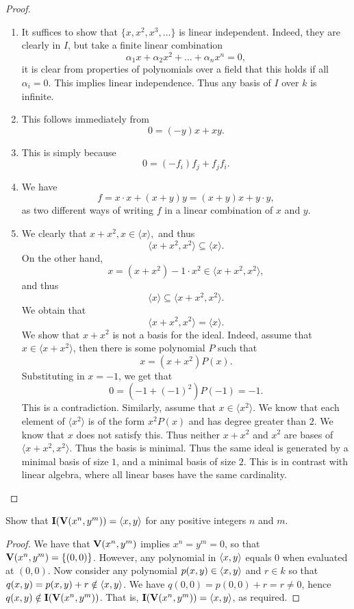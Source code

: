 \begin{proof}
    \begin{enumerate}
        \item It suffices to show that $\{x,x^2,x^3, ...\}$ is linear independent. Indeed, they are clearly in $I$, but take a finite linear combination
        $$\alpha_1 x + \alpha_2 x^2 + ... + \alpha_n x^n = 0,$$
        it is clear from properties of polynomials over a field that this holds if all $\alpha_i = 0$. This implies linear independence. Thus any basis of $I$ over $k$ is infinite.
        \item This follows immediately from
        $$0 = (-y)x + xy.$$
        \item This is simply because
        $$0 = (-f_i)f_j + f_jf_i.$$
        \item We have
        $$f = x\cdot x + (x+y)y = (x+y)x + y\cdot y,$$
        as two different ways of writing $f$ in a linear combination of $x$ and $y$.
    \item We clearly that
    $x+x^2, x\in \langle x\rangle,$
    and thus
    $$\langle x+x^2, x^2\rangle \subseteq \langle x\rangle.$$
    On the other hand,
    $$x = (x+x^2) - 1\cdot x^2 \in \langle x+x^2, x^2\rangle,$$
    and thus
    $$\langle x\rangle \subseteq \langle x+x^2, x^2\rangle.$$
    We obtain that
    $$\langle x+x^2, x^2\rangle = \langle x\rangle.$$
    We show that $x+x^2$ is not a basis for the ideal. Indeed, assume that $x\in \langle x+x^2\rangle$, then there is some polynomial $P$ such that
    $$x = (x + x^2)P(x).$$
    Substituting in $x=-1$, we get that
    $$0 = (-1 + (-1)^2)P(-1) = -1.$$
    This is a contradiction. Similarly, assume that $x \in \langle x^2\rangle$. We know that each element of $\langle x^2 \rangle$ is of the form $x^2 P(x)$ and has degree greater than $2$. We know that $x$ does not satisfy this. Thus neither $x+x^2$ and $x^2$ are bases of $\langle x+x^2, x^2\rangle$. Thus the basis is minimal. Thus the same ideal is generated by a minimal basis of size $1$, and a minimal basis of size $2$. This is in contrast with linear algebra, where all linear bases have the same cardinality.
    \end{enumerate}
\end{proof}

\begin{exercise}{7}
Show that $\mathbf{I}(\mathbf{V}(x^n,y^m))=\langle x,y\rangle$ for any positive integers $n$ and $m$.
\end{exercise}
\begin{proof}
We have that $\mathbf{V}(x^n,y^m)$ implies $x^n=y^m=0$, so that $\mathbf{V}(x^n,y^m)=\{(0,0)\}$. However, any polynomial in $\langle x,y\rangle$ equals 0 when evaluated at $(0,0)$. Now consider any polynomial $p(x,y)\in\langle x,y\rangle$ and $r\in k$ so that $q(x,y)=p(x,y)+r\notin\langle x,y\rangle$. We have $q(0,0)=p(0,0)+r=r\neq 0$, hence $q(x,y)\notin\mathbf{I}(\mathbf{V}(x^n,y^m))$. That is, $\mathbf{I}(\mathbf{V}(x^n,y^m))=\langle x,y\rangle$, as required.
\end{proof}

